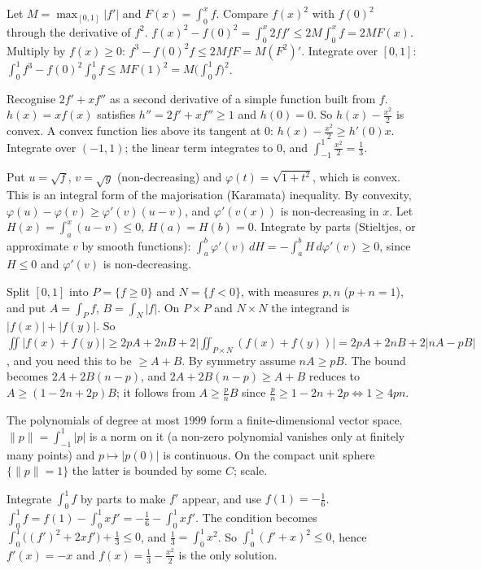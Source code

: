 \documentclass[11pt,a4paper]{article}
\begin{document}

 Let $M=\max_{[0,1]}|f'|$ and $F(x)=\int_0^xf$. Compare $f(x)^2$ with $f(0)^2$ through the derivative of $f^2$.
 $f(x)^2-f(0)^2=\int_0^x2ff'\le2M\int_0^xf=2MF(x)$. Multiply by $f(x)\ge0$: $f^3-f(0)^2f\le2Mf F=M(F^2)'$.
 Integrate over $[0,1]$: $\int_0^1f^3-f(0)^2\int_0^1f\le MF(1)^2=M\big(\int_0^1f\big)^2$.

 Recognise $2f'+xf''$ as a second derivative of a simple function built from $f$.
 $h(x)=xf(x)$ satisfies $h''=2f'+xf''\ge1$ and $h(0)=0$. So $h(x)-\frac{x^2}2$ is convex.
 A convex function lies above its tangent at $0$: $h(x)-\frac{x^2}2\ge h'(0)x$. Integrate over $(-1,1)$; the linear term integrates to $0$, and $\int_{-1}^1\frac{x^2}2=\frac13$.

 Put $u=\sqrt f$, $v=\sqrt g$ (non-decreasing) and $\varphi(t)=\sqrt{1+t^2}$, which is convex. This is an integral form of the majorisation (Karamata) inequality.
 By convexity, $\varphi(u)-\varphi(v)\ge\varphi'(v)(u-v)$, and $\varphi'(v(x))$ is non-decreasing in $x$. Let $H(x)=\int_a^x(u-v)\le0$, $H(a)=H(b)=0$.
 Integrate by parts (Stieltjes, or approximate $v$ by smooth functions): $\int_a^b\varphi'(v)\,dH=-\int_a^bH\,d\varphi'(v)\ge0$, since $H\le0$ and $\varphi'(v)$ is non-decreasing.

 Split $[0,1]$ into $P=\{f\ge0\}$ and $N=\{f<0\}$, with measures $p,n$ ($p+n=1$), and put $A=\int_P f$, $B=\int_N|f|$. On $P\times P$ and $N\times N$ the integrand is $|f(x)|+|f(y)|$.
 So $\iint|f(x)+f(y)|\ge2pA+2nB+2\big|\iint_{P\times N}(f(x)+f(y))\big|=2pA+2nB+2|nA-pB|$, and you need this to be $\ge A+B$.
 By symmetry assume $nA\ge pB$. The bound becomes $2A+2B(n-p)$, and $2A+2B(n-p)\ge A+B$ reduces to $A\ge(1-2n+2p)B$; it follows from $A\ge\frac pnB$ since $\frac pn\ge1-2n+2p\iff1\ge4pn$.

 The polynomials of degree at most $1999$ form a finite-dimensional vector space.
 $\|p\|=\int_{-1}^1|p|$ is a norm on it (a non-zero polynomial vanishes only at finitely many points) and $p\mapsto|p(0)|$ is continuous. On the compact unit sphere $\{\|p\|=1\}$ the latter is bounded by some $C$; scale.

 Integrate $\int_0^1f$ by parts to make $f'$ appear, and use $f(1)=-\frac16$.
 $\int_0^1f=f(1)-\int_0^1xf'=-\frac16-\int_0^1xf'$. The condition becomes $\int_0^1\big((f')^2+2xf'\big)+\frac13\le0$, and $\frac13=\int_0^1x^2$.
 So $\int_0^1(f'+x)^2\le0$, hence $f'(x)=-x$ and $f(x)=\frac13-\frac{x^2}2$ is the only solution.
\end{document}
